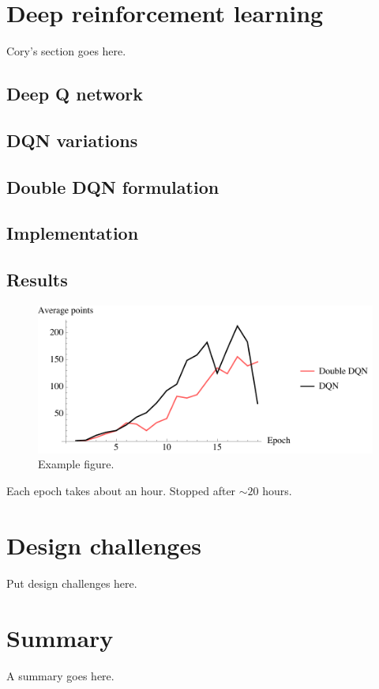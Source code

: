 \documentclass{article}
\begin{document}
\section{Deep reinforcement learning}
Cory's section goes here.
\subsection{Deep Q network}
\subsection{DQN variations}
\subsection{Double DQN formulation}
\subsection{Implementation}
\subsection{Results}
\begin{figure}[H]
  \centering
  \includegraphics[width=120mm]{dqn_rewardper.pdf}
  \caption{Example figure.}
\end{figure}
Each epoch takes about an hour. Stopped after $\sim 20$ hours.\\

\section{Design challenges}
Put design challenges here.

\section{Summary}
A summary goes here.



\pagebreak
\end{document}
